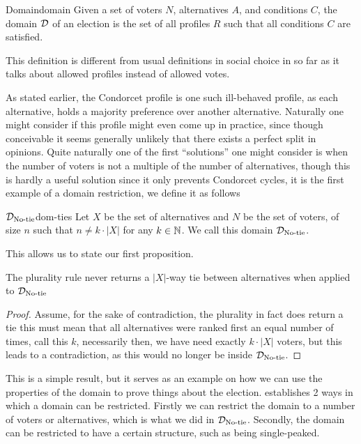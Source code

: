 \begin{definition}{Domain}{domain}
	{
		Given a set of voters $N$, alternatives $A$, and conditions $C$, the domain $\mathcal{D}_{\textnormal{}}$ of an election is the set of all profiles $R$ such that all conditions $C$ are satisfied.
	}
\end{definition}

This definition is different from usual definitions in social choice in so far as it talks about allowed profiles instead of allowed votes.


As stated earlier, the Condorcet profile is one such ill-behaved profile, as each alternative, holds a majority preference over another alternative. Naturally one might consider if this profile might even come up in practice, since though conceivable it seems generally unlikely that there exists a perfect split in opinions. Quite naturally one of the first ``solutions” one might consider is when the number of voters is not a multiple of the number of alternatives, though this is hardly a useful solution since it only prevents Condorcet cycles, it is the first example of a domain restriction, we define it as follows

\begin{definition}{$\mathcal{D}_{\textnormal{No-tie}}$}{dom-ties}
	Let $X$ be the set of alternatives and $N$ be the set of voters, of size $n$ such that $n \neq k \cdot |X|$ for any $k \in \mathbb{N}$. We call this domain $\mathcal{D}_{\textnormal{No-tie}}$.
\end{definition}

This allows us to state our first proposition.

\begin{proposition}
	The plurality rule never returns a $|X|$-way tie between alternatives when applied to $\mathcal{D}_{\textnormal{No-tie}}$
\end{proposition}

\begin{proof}
	Assume, for the sake of contradiction, the plurality in fact does return a tie this must mean that all alternatives were ranked first an equal number of times, call this $k$, necessarily then, we have need exactly $k \cdot |X|$ voters, but this leads to a contradiction, as this would no longer be inside $\mathcal{D}_{\textnormal{No-tie}}$.
\end{proof}

This is a simple result, but it serves as an example on how we can use the properties of the domain to prove things about the election. \citet{gaertnerChapter3Domain2002} establishes 2 ways in which a domain can be restricted. Firstly we can restrict the domain to a number of voters or alternatives, which is what we did in $\mathcal{D}_{\textnormal{No-tie}}$. Secondly, the domain can be restricted to have a certain structure, such as being single-peaked.

